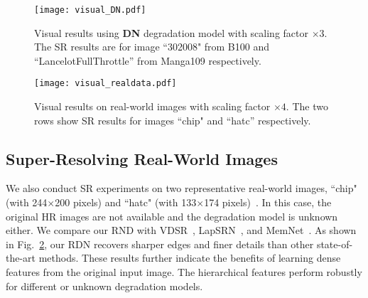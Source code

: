 \documentclass[10pt,twocolumn,letterpaper]{article}
\begin{document}
\begin{figure}[htbp]
\centering
\texttt{[image: visual\_DN.pdf]}
\caption{Visual results using \textbf{DN} degradation model with scaling factor $\times3$. The SR results are for image ``302008" from B100 and ``LancelotFullThrottle'' from Manga109 respectively.}
\label{fig:visual_DN}  
\vspace{-5mm}
\end{figure}

\begin{figure}[htbp]
\centering
\texttt{[image: visual\_realdata.pdf]}
\caption{Visual results on real-world images with scaling factor $\times4$. The two rows show SR results for images ``chip" and ``hatc'' respectively.}
\label{fig:visual_realdata} 
\vspace{-5mm} 
\end{figure}
\vspace{-1mm}
\subsection{Super-Resolving Real-World Images}
\label{subsec:realworld}
\vspace{-1mm}
We also conduct SR experiments on two representative real-world images, ``chip" (with 244$\times$200 pixels) and ``hatc" (with 133$\times$174 pixels)~\cite{zhang2017collaborative}. In this case, the original HR images are not available and the degradation model is unknown either. We compare our RND with VDSR~\cite{kim2016accurate}, LapSRN~\cite{lai2017deep}, and MemNet~\cite{tai2017memnet}. As shown in Fig.~\ref{fig:visual_realdata}, our RDN recovers sharper edges and finer details than other state-of-the-art methods. These results further indicate the benefits of learning dense features from the original input image. The hierarchical features perform robustly for different or unknown degradation models.
\vspace{-3mm}
\end{document}
